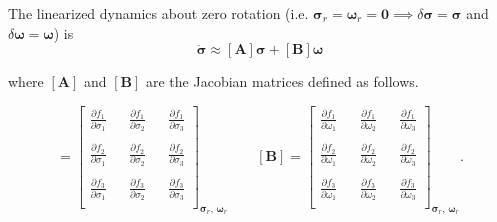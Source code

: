\documentclass[12pt, a4paper]{article}
\begin{document}
The linearized dynamics about zero rotation (i.e. $\bm{\sigma}_{r}=\bm{\omega}_{r}=\bm{0} \implies \delta\bm{\sigma}=\bm{\sigma}$ and $\delta\bm{\omega}=\bm{\omega}$) is
$$
\dot{\bm{\sigma}}\approx[\bm{A}]\bm{\sigma}+[\bm{B}]\bm{\omega}
$$

where $[\bm{A}]$ and $[\bm{B}]$ are the Jacobian matrices defined as follows.

\begin{equation}
    [\bm{A}] = 
    \begin{bmatrix}
        \frac{\partial f_{1}}{\partial\sigma_{1}} && \frac{\partial f_{1}}{\partial\sigma_{2}} && \frac{\partial f_{1}}{\partial\sigma_{3}}\\ \\
        \frac{\partial f_{2}}{\partial\sigma_{1}} && \frac{\partial f_{2}}{\partial\sigma_{2}} && \frac{\partial f_{2}}{\partial\sigma_{3}}\\ \\
        \frac{\partial f_{3}}{\partial\sigma_{1}} && \frac{\partial f_{3}}{\partial\sigma_{2}} && \frac{\partial f_{3}}{\partial\sigma_{3}}\\
    \end{bmatrix}_{\bm{\sigma}_{r},\,\bm{\omega}_{r}}
    \quad\quad
    [\bm{B}] = 
    \begin{bmatrix}
        \frac{\partial f_{1}}{\partial\omega_{1}} && \frac{\partial f_{1}}{\partial\omega_{2}} && \frac{\partial f_{1}}{\partial\omega_{3}}\\ \\
        \frac{\partial f_{2}}{\partial\omega_{1}} && \frac{\partial f_{2}}{\partial\omega_{2}} && \frac{\partial f_{2}}{\partial\omega_{3}}\\ \\
        \frac{\partial f_{3}}{\partial\omega_{1}} && \frac{\partial f_{3}}{\partial\omega_{2}} && \frac{\partial f_{3}}{\partial\omega_{3}}\\
    \end{bmatrix}_{\bm{\sigma}_{r},\,\bm{\omega}_{r}}.
\end{equation}
\end{document}
